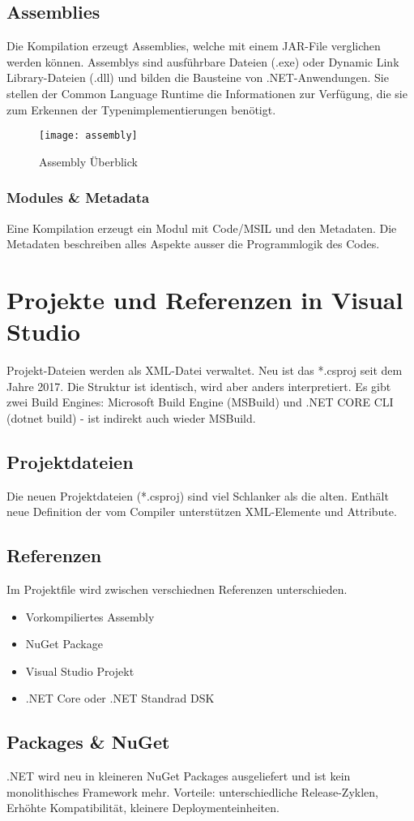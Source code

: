 \subsection{Assemblies}
Die Kompilation erzeugt Assemblies, welche mit einem JAR-File verglichen werden können. Assemblys sind ausführbare Dateien (.exe) oder Dynamic Link Library-Dateien (.dll) und bilden die Bausteine von .NET-Anwendungen. Sie stellen der Common Language Runtime die Informationen zur Verfügung, die sie zum Erkennen der Typenimplementierungen benötigt.

\begin{figure}[h!]
	\centering
  	\texttt{[image: assembly]}
    \caption{Assembly Überblick}
\end{figure}

\subsubsection{Modules \& Metadata}
Eine Kompilation erzeugt ein Modul mit Code/MSIL und den Metadaten. Die Metadaten beschreiben alles Aspekte ausser die Programmlogik des Codes.

\pagebreak

\section{Projekte und Referenzen in Visual Studio}
Projekt-Dateien werden als XML-Datei verwaltet. Neu ist das *.csproj seit dem Jahre 2017.  Die Struktur ist identisch, wird aber anders interpretiert. Es gibt zwei Build Engines: Microsoft Build Engine (MSBuild) und .NET CORE CLI (dotnet build) - ist indirekt auch wieder MSBuild.

\subsection{Projektdateien}
Die neuen Projektdateien (*.csproj) sind viel Schlanker als die alten. Enthält neue Definition der vom Compiler unterstützen XML-Elemente und Attribute. 

\subsection{Referenzen}
Im Projektfile wird zwischen verschiednen Referenzen unterschieden.
\begin{itemize}
  \itemsep -0.5em 
  \item Vorkompiliertes Assembly
  \item NuGet Package
  \item Visual Studio Projekt
  \item .NET Core oder .NET Standrad DSK
\end{itemize}

\subsection{Packages \& NuGet}
.NET wird neu in kleineren NuGet Packages ausgeliefert und ist kein monolithisches Framework mehr. Vorteile: unterschiedliche Release-Zyklen, Erhöhte Kompatibilität, kleinere Deploymenteinheiten.

\pagebreak
